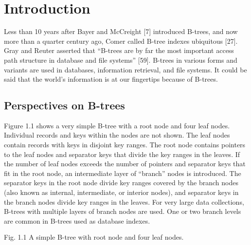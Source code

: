 \hypertarget{introduction}{%
\chapter{Introduction}\label{introduction}}

Less than 10 years after Bayer and McCreight {[}7{]} introduced B-trees,
and now more than a quarter century ago, Comer called B-tree indexes
ubiquitous {[}27{]}. Gray and Reuter asserted that ``B-trees are by far
the most important access path structure in database and file systems''
{[}59{]}. B-trees in various forms and variants are used in databases,
information retrieval, and file systems. It could be said that the
world's information is at our fingertips because of B-trees.

\hypertarget{perspectives-on-b-trees}{%
\section{Perspectives on B-trees}\label{perspectives-on-b-trees}}

Figure 1.1 shows a very simple B-tree with a root node and four leaf
nodes. Individual records and keys within the nodes are not shown. The
leaf nodes contain records with keys in disjoint key ranges. The root
node contains pointers to the leaf nodes and separator keys that divide
the key ranges in the leaves. If the number of leaf nodes exceeds the
number of pointers and separator keys that fit in the root node, an
intermediate layer of ``branch'' nodes is introduced. The separator keys
in the root node divide key ranges covered by the branch nodes (also
known as internal, intermediate, or interior nodes), and separator keys
in the branch nodes divide key ranges in the leaves. For very large data
collections, B-trees with multiple layers of branch nodes are used. One
or two branch levels are common in B-trees used as database indexes.

Fig. 1.1 A simple B-tree with root node and four leaf nodes.


